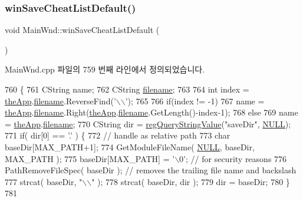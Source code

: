 \subsubsection{\texorpdfstring{win\+Save\+Cheat\+List\+Default()}{winSaveCheatListDefault()}}
{\footnotesize\ttfamily void Main\+Wnd\+::win\+Save\+Cheat\+List\+Default (\begin{DoxyParamCaption}{ }\end{DoxyParamCaption})}



Main\+Wnd.\+cpp 파일의 759 번째 라인에서 정의되었습니다.


\begin{DoxyCode}
760 \{
761   CString name;
762   CString \mbox{\hyperlink{_s_d_l_8cpp_ac33a174c39700095ca0f892624d85a3f}{filename}};
763 
764   \textcolor{keywordtype}{int} index = \mbox{\hyperlink{_v_b_a_8cpp_a8095a9d06b37a7efe3723f3218ad8fb3}{theApp}}.\mbox{\hyperlink{class_v_b_a_a66eee6b61ec8bee20f21164cb0c37d2d}{filename}}.ReverseFind(\textcolor{charliteral}{'\(\backslash\)\(\backslash\)'});
765 
766   \textcolor{keywordflow}{if}(index != -1)
767     name = \mbox{\hyperlink{_v_b_a_8cpp_a8095a9d06b37a7efe3723f3218ad8fb3}{theApp}}.\mbox{\hyperlink{class_v_b_a_a66eee6b61ec8bee20f21164cb0c37d2d}{filename}}.Right(\mbox{\hyperlink{_v_b_a_8cpp_a8095a9d06b37a7efe3723f3218ad8fb3}{theApp}}.\mbox{\hyperlink{class_v_b_a_a66eee6b61ec8bee20f21164cb0c37d2d}{filename}}.GetLength()-index-1);
768   \textcolor{keywordflow}{else}
769     name = \mbox{\hyperlink{_v_b_a_8cpp_a8095a9d06b37a7efe3723f3218ad8fb3}{theApp}}.\mbox{\hyperlink{class_v_b_a_a66eee6b61ec8bee20f21164cb0c37d2d}{filename}};
770   CString dir = \mbox{\hyperlink{_reg_8cpp_a618826d274df0d9c19fab2ff28bd9008}{regQueryStringValue}}(\textcolor{stringliteral}{"saveDir"}, \mbox{\hyperlink{getopt1_8c_a070d2ce7b6bb7e5c05602aa8c308d0c4}{NULL}});
771   \textcolor{keywordflow}{if}( dir[0] == \textcolor{charliteral}{'.'} ) \{
772       \textcolor{comment}{// handle as relative path}
773       \textcolor{keywordtype}{char} baseDir[MAX\_PATH+1];
774       GetModuleFileName( \mbox{\hyperlink{getopt1_8c_a070d2ce7b6bb7e5c05602aa8c308d0c4}{NULL}}, baseDir, MAX\_PATH );
775       baseDir[MAX\_PATH] = \textcolor{charliteral}{'\(\backslash\)0'}; \textcolor{comment}{// for security reasons}
776       PathRemoveFileSpec( baseDir ); \textcolor{comment}{// removes the trailing file name and backslash}
777       strcat( baseDir, \textcolor{stringliteral}{"\(\backslash\)\(\backslash\)"} );
778       strcat( baseDir, dir );
779       dir = baseDir;
780     \}
781 

\end{DoxyCode}
